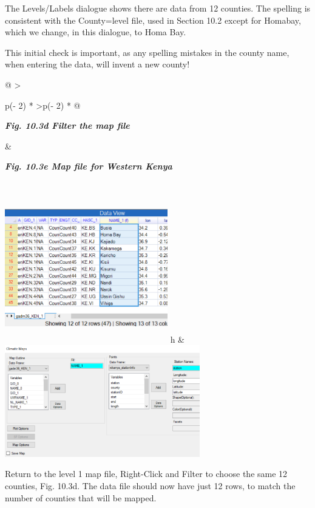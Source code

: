 \documentclass[
  letterpaper,
  DIV=11,
  numbers=noendperiod]{scrreprt}
\begin{document}
The Levels/Labels dialogue shows there are data from 12 counties. The
spelling is consistent with the County=level file, used in Section 10.2
except for Homabay, which we change, in this dialogue, to Homa Bay.

This initial check is important, as any spelling mistakes in the county
name, when entering the data, will invent a new county!

\begin{longtable}[]{@{}
  >{\raggedright\arraybackslash}p{(\columnwidth - 2\tabcolsep) * }
  >{\raggedleft\arraybackslash}p{(\columnwidth - 2\tabcolsep) * }@{}}
\toprule\noalign{}
\begin{minipage}[b]{\linewidth}\raggedright
\textbf{\emph{Fig. 10.3d Filter the map file}}
\end{minipage} & \begin{minipage}[b]{\linewidth}\raggedleft
\textbf{\emph{Fig. 10.3e Map file for Western Kenya}}
\end{minipage} \\
\midrule\noalign{}
\endhead
\bottomrule\noalign{}
\endlastfoot
\includegraphics[width=2.79165in,height=2.56192in]{figures/Fig10.3d.png}
h &
\includegraphics[width=3.34615in,height=\textheight]{figures/Fig10.3e.png} \\
\end{longtable}

Return to the level 1 map file, Right-Click and Filter to choose the
same 12 counties, Fig. 10.3d. The data file should now have just 12
rows, to match the number of counties that will be mapped.
\end{document}
